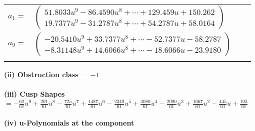 \documentclass[1p]{elsarticle_modified}
\theoremstyle{definition}
\begin{document}
\begin{tabular}{m{7pt} m{180pt} m{7pt} m{180pt} }
\flushright $a_{1}=$&$\begin{pmatrix}51.8033 u^{9}-86.4590 u^{8}+\cdots+129.459 u+150.262\\19.7377 u^{9}-31.2787 u^{8}+\cdots+54.2787 u+58.0164\end{pmatrix}$ \\
\flushright $a_{9}=$&$\begin{pmatrix}-20.5410 u^{9}+33.7377 u^{8}+\cdots-52.7377 u-58.2787\\-8.31148 u^{9}+14.6066 u^{8}+\cdots-18.6066 u-23.9180\end{pmatrix}$\\&\end{tabular}
\flushleft \textbf{(ii) Obstruction class $= -1$}\\~\\
\flushleft \textbf{(iii) Cusp Shapes $= -\frac{62}{61} u^9+\frac{201}{61} u^8-\frac{725}{61} u^7+\frac{1487}{61} u^6-\frac{2349}{61} u^5+\frac{3080}{61} u^4-\frac{2090}{61} u^3+\frac{1667}{61} u^2-\frac{445}{61} u+\frac{103}{61}$}\\~\\
\newpage\renewcommand{\arraystretch}{1}
\flushleft \textbf{(iv) u-Polynomials at the component}\newline \\
\end{document}
